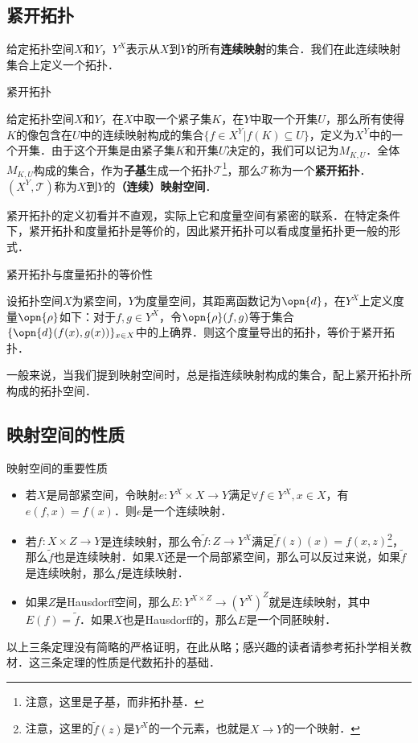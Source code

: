 
\subsection{紧开拓扑}

给定拓扑空间$X$和$Y$，$Y^X$表示从$X$到$Y$的所有\textbf{连续映射}的集合．我们在此连续映射集合上定义一个拓扑．

\begin{definition}{紧开拓扑}

给定拓扑空间$X$和$Y$，在$X$中取一个紧子集$K$，在$Y$中取一个开集$U$，那么所有使得$K$的像包含在$U$中的连续映射构成的集合$\{f\in X^Y|f(K)\subseteq U\}$，定义为$X^Y$中的一个开集．由于这个开集是由紧子集$K$和开集$U$决定的，我们可以记为$M_{K, U}$．全体$M_{K, U}$构成的集合，作为\textbf{子基}生成一个拓扑$\mathcal{T}$\footnote{注意，这里是子基，而非拓扑基．}，那么$\mathcal{T}$称为一个\textbf{紧开拓扑}．$(X^Y, \mathcal{T})$称为$X$到$Y$的\textbf{（连续）映射空间}．

\end{definition}

紧开拓扑的定义初看并不直观，实际上它和度量空间有紧密的联系．在特定条件下，紧开拓扑和度量拓扑是等价的，因此紧开拓扑可以看成度量拓扑更一般的形式．

\begin{theorem}{紧开拓扑与度量拓扑的等价性}

设拓扑空间$X$为紧空间，$Y$为度量空间，其距离函数记为$\opn{d}$，在$Y^X$上定义度量$\opn{\rho}$如下：对于$f, g\in Y^X$，令$\opn{\rho}(f, g)$等于集合$\{\opn{d}(f(x), g(x))\}_{x\in X}$中的上确界．则这个度量导出的拓扑，等价于紧开拓扑．

\end{theorem}

一般来说，当我们提到映射空间时，总是指连续映射构成的集合，配上紧开拓扑所构成的拓扑空间．

\subsection{映射空间的性质}

\begin{theorem}{映射空间的重要性质}\label{Topo8_the1}
\begin{itemize}
\item 若$X$是局部紧空间，令映射$e:Y^X\times X\rightarrow Y$满足$\forall f\in Y^X, x\in X$，有$e(f, x)=f(x)$．则$e$是一个连续映射．
\item 若$f:X\times Z\rightarrow Y$是连续映射，那么令$\tilde{f}:Z\rightarrow Y^X$满足$\tilde{f}(z)(x)=f(x, z)$\footnote{注意，这里的$\tilde{f}(z)$是$Y^X$的一个元素，也就是$X\rightarrow Y$的一个映射．}，那么$\tilde{f}$也是连续映射．如果$X$还是一个局部紧空间，那么可以反过来说，如果$\tilde{f}$是连续映射，那么$f$是连续映射．
\item 如果$Z$是Hausdorff空间，那么$E:Y^{X\times Z}\rightarrow(Y^X)^Z$就是连续映射，其中$E(f)=\tilde{f}$．如果$X$也是Hausdorff的，那么$E$是一个同胚映射．

\end{itemize}
\end{theorem}

以上三条定理没有简略的严格证明，在此从略；感兴趣的读者请参考拓扑学相关教材．这三条定理的性质是代数拓扑的基础．